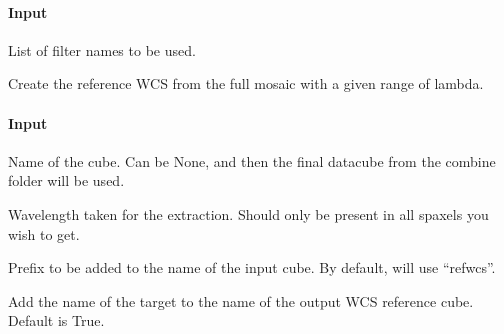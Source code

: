 \documentclass[letterpaper,10pt,english]{sphinxmanual}
\begin{document}
\begin{fulllineitems}
\begin{fulllineitems}
\paragraph{Input}
\label{\detokenize{api/pymusepipe:id40}}\begin{description}
\sphinxAtStartPar
List of filter names to be used.

\end{description}

\end{fulllineitems}


\begin{fulllineitems}
\label{\detokenize{api/pymusepipe:pymusepipe.combine.MusePointings.create_combined_wcs}}
\pysigstartsignatures
{}
\pysigstopsignatures
\sphinxAtStartPar
Create the reference WCS from the full mosaic
with a given range of lambda.


\paragraph{Input}
\label{\detokenize{api/pymusepipe:id41}}\begin{description}
\sphinxAtStartPar
Name of the cube. Can be None, and then the final
datacube from the combine folder will be used.

\sphinxAtStartPar
Wavelength taken for the extraction. Should only
be present in all spaxels you wish to get.

\sphinxAtStartPar
Prefix to be added to the name of the input cube.
By default, will use “refwcs”.

\sphinxAtStartPar
Add the name of the target to the name of the output
WCS reference cube. Default is True.

\end{description}


\end{fulllineitems}
\end{fulllineitems}
\end{document}
